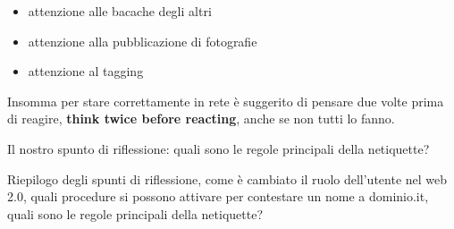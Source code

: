 \begin{itemize}
    \item attenzione alle bacache degli altri
    \item attenzione alla pubblicazione di fotografie
    \item attenzione al tagging
\end{itemize}

Insomma per stare correttamente in rete è suggerito di pensare due volte prima di reagire, \textbf{think twice before reacting}, anche se non tutti lo fanno.

Il nostro spunto di riflessione: quali sono le regole principali della netiquette?

Riepilogo degli spunti di riflessione, come è cambiato il ruolo dell'utente nel web 2.0, quali procedure si possono attivare per contestare un nome a dominio.it, quali sono le regole principali della netiquette?

